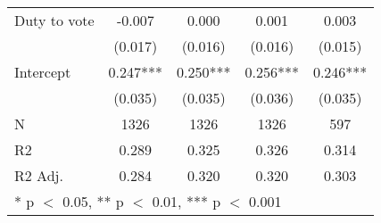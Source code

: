 \begin{tabular}[t]{lcccc}
Duty to vote & -0.007 & 0.000 & 0.001 & 0.003\\
 & (0.017) & (0.016) & (0.016) & (0.015)\\
Intercept & 0.247*** & 0.250*** & 0.256*** & 0.246***\\
 & (0.035) & (0.035) & (0.036) & (0.035)\\
\midrule
N & 1326 & 1326 & 1326 & 597\\
R2 & 0.289 & 0.325 & 0.326 & 0.314\\
R2 Adj. & 0.284 & 0.320 & 0.320 & 0.303\\
\bottomrule
\multicolumn{5}{l}{\rule{0pt}{1em}* p $<$ 0.05, ** p $<$ 0.01, *** p $<$ 0.001}\\
\end{tabular}
